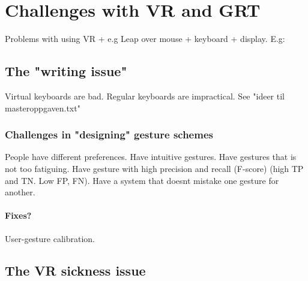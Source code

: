 \chapter{Challenges with VR and GRT} 
Problems with using VR + e.g Leap over mouse + keyboard + display. E.g:

\section{The "writing issue"}
Virtual keyboards are bad. 
Regular keyboards are impractical. 
See "ideer til masteroppgaven.txt"

\subsection{Challenges in "designing" gesture schemes}
People have different preferences. Have intuitive gestures. Have gestures that is not too
fatiguing. Have gesture with high precision and recall (F-score) (high TP and TN. Low FP, FN).
Have a system that doesnt mistake one gesture for another.

\subsubsection{Fixes?}
User-gesture calibration. 

\section{The VR sickness issue}